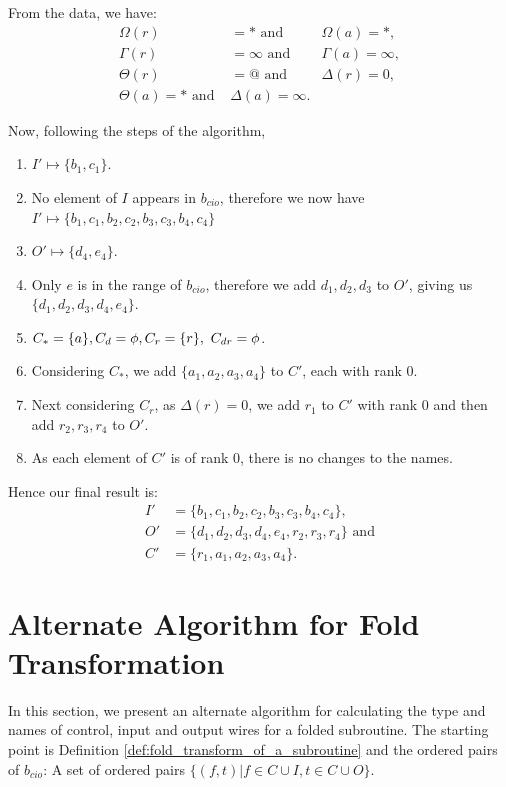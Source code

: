 From the data, we have:
\begin{align*}
  \Omega(r) &= *\text{ and }&\Omega(a) = *,\\
  \Gamma(r)&=\infty\text{ and }&\Gamma(a) = \infty,\\
  \Theta(r)&=@\text{ and }&\Delta(r)=0,\\
  \Theta(a)=*\text{ and } &\Delta(a)=\infty.
\end{align*}

Now, following the steps of the algorithm,
\begin{enumerate}
  \item $I' \mapsto \{b_1,c_1\}$.
  \item No element of $I$ appears in $b_{cio}$, therefore we now have
    $I' \mapsto \{b_1,c_1,b_2,c_2,b_3,c_3,b_4,c_4\}$
  \item $O' \mapsto \{d_4,e_4\}$.
  \item Only $e$ is in the range of $b_{cio}$, therefore we add
  $d_1,d_2,d_3$ to  $O'$, giving us $\{d_1,d_2,d_3,d_4,e_4\}$.
  \item $C_*=\{a\},C_d=\nothing, C_r = \{r\},\ C_{dr}=\nothing$.
  \item Considering $C_*$, we add $\{a_1,a_2,a_3,a_4\}$ to $C'$, each with
    rank 0.
  \item Next considering $C_r$, as $\Delta(r)=0$, we add $r_1$ to $C'$ with
    rank 0 and then add $r_2,r_3,r_4$ to $O'$.
  \item As each element of $C'$ is of rank 0, there is no changes
    to the names.
\end{enumerate}

Hence our final result is:
\begin{align*}
  I'&=\{b_1,c_1,b_2,c_2,b_3,c_3,b_4,c_4\},\\
  O'&=\{d_1,d_2,d_3,d_4,e_4,r_2,r_3,r_4\}\text{ and}\\
  C'&=\{r_1,a_1,a_2,a_3,a_4\}.
\end{align*}


\section{Alternate Algorithm for Fold Transformation} %
\label{sec:alternate_algorithm_for_fold_transformation}
In  this section, we present an alternate algorithm for calculating the
type and names of control, input and output wires for a folded
subroutine.  The starting point is Definition
\ref{def:fold_transform_of_a_subroutine}
and the ordered pairs of $b_{cio}$: A set of ordered pairs
$\{(f,t)|f\in C\cup I, t \in C\cup O\}$.

